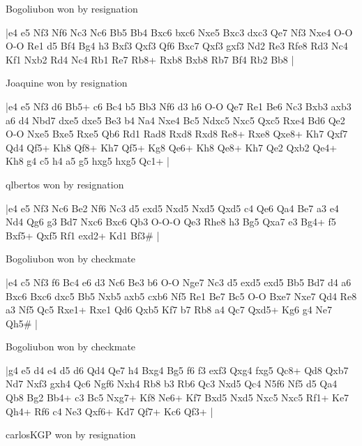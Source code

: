 \showboard

Bogoliubon won by resignation

\makegametitle
|e4 e5 Nf3 Nf6 Nc3 Nc6 Bb5 Bb4 Bxc6 bxc6 Nxe5 Bxc3 dxc3 Qe7 Nf3 Nxe4 O-O O-O Re1 d5 Bf4 Bg4 h3 Bxf3 Qxf3 Qf6 Bxc7 Qxf3 gxf3 Nd2 Re3 Rfe8 Rd3 Nc4 Kf1 Nxb2 Rd4 Nc4 Rb1 Re7 Rb8+ Rxb8 Bxb8 Rb7 Bf4 Rb2 Bb8  |

\showboard

Joaquine won by resignation

\makegametitle
|e4 e5 Nf3 d6 Bb5+ c6 Bc4 b5 Bb3 Nf6 d3 h6 O-O Qe7 Re1 Be6 Nc3 Bxb3 axb3 a6 d4 Nbd7 dxe5 dxe5 Be3 b4 Na4 Nxe4 Bc5 Ndxc5 Nxc5 Qxc5 Rxe4 Bd6 Qe2 O-O Nxe5 Bxe5 Rxe5 Qb6 Rd1 Rad8 Rxd8 Rxd8 Re8+ Rxe8 Qxe8+ Kh7 Qxf7 Qd4 Qf5+ Kh8 Qf8+ Kh7 Qf5+ Kg8 Qe6+ Kh8 Qe8+ Kh7 Qe2 Qxb2 Qe4+ Kh8 g4 c5 h4 a5 g5 hxg5 hxg5 Qc1+  |

\showboard

qlbertos won by resignation

\makegametitle
|e4 e5 Nf3 Nc6 Be2 Nf6 Nc3 d5 exd5 Nxd5 Nxd5 Qxd5 c4 Qe6 Qa4 Be7 a3 e4 Nd4 Qg6 g3 Bd7 Nxc6 Bxc6 Qb3 O-O-O Qe3 Rhe8 h3 Bg5 Qxa7 e3 Bg4+ f5 Bxf5+ Qxf5 Rf1 exd2+ Kd1 Bf3\#  |

\showboard

Bogoliubon won by checkmate

\makegametitle
|e4 c5 Nf3 f6 Bc4 e6 d3 Nc6 Be3 b6 O-O Nge7 Nc3 d5 exd5 exd5 Bb5 Bd7 d4 a6 Bxc6 Bxc6 dxc5 Bb5 Nxb5 axb5 cxb6 Nf5 Re1 Be7 Bc5 O-O Bxe7 Nxe7 Qd4 Re8 a3 Nf5 Qc5 Rxe1+ Rxe1 Qd6 Qxb5 Kf7 b7 Rb8 a4 Qc7 Qxd5+ Kg6 g4 Ne7 Qh5\#  |

\showboard

Bogoliubon won by checkmate

\makegametitle
|g4 e5 d4 e4 d5 d6 Qd4 Qe7 h4 Bxg4 Bg5 f6 f3 exf3 Qxg4 fxg5 Qc8+ Qd8 Qxb7 Nd7 Nxf3 gxh4 Qc6 Ngf6 Nxh4 Rb8 b3 Rb6 Qc3 Nxd5 Qc4 N5f6 Nf5 d5 Qa4 Qb8 Bg2 Bb4+ c3 Bc5 Nxg7+ Kf8 Ne6+ Kf7 Bxd5 Nxd5 Nxc5 Nxc5 Rf1+ Ke7 Qh4+ Rf6 c4 Ne3 Qxf6+ Kd7 Qf7+ Kc6 Qf3+  |

\showboard

carlosKGP won by resignation

